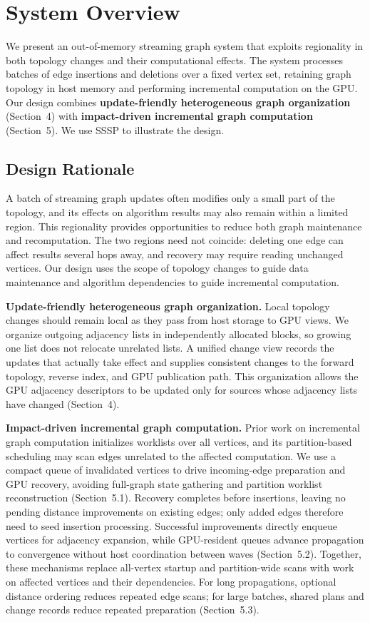 
\section{System Overview}


We present an out-of-memory streaming graph system that exploits regionality in both topology changes and their computational effects. The system processes batches of edge insertions and deletions over a fixed vertex set, retaining graph topology in host memory and performing incremental computation on the GPU. Our design combines \textbf{update-friendly heterogeneous graph organization} (Section~4) with \textbf{impact-driven incremental graph computation} (Section~5). We use SSSP to illustrate the design.

\subsection{Design Rationale}


A batch of streaming graph updates often modifies only a small part of the topology, and its effects on algorithm results may also remain within a limited region. This regionality provides opportunities to reduce both graph maintenance and recomputation. The two regions need not coincide: deleting one edge can affect results several hops away, and recovery may require reading unchanged vertices. Our design uses the scope of topology changes to guide data maintenance and algorithm dependencies to guide incremental computation.

\textbf{Update-friendly heterogeneous graph organization.} Local topology changes should remain local as they pass from host storage to GPU views. We organize outgoing adjacency lists in independently allocated blocks, so growing one list does not relocate unrelated lists. A unified change view records the updates that actually take effect and supplies consistent changes to the forward topology, reverse index, and GPU publication path. This organization allows the GPU adjacency descriptors to be updated only for sources whose adjacency lists have changed (Section~4).

\textbf{Impact-driven incremental graph computation.} Prior work on incremental graph computation initializes worklists over all vertices, and its partition-based scheduling may scan edges unrelated to the affected computation. We use a compact queue of invalidated vertices to drive incoming-edge preparation and GPU recovery, avoiding full-graph state gathering and partition worklist reconstruction (Section~5.1). Recovery completes before insertions, leaving no pending distance improvements on existing edges; only added edges therefore need to seed insertion processing. Successful improvements directly enqueue vertices for adjacency expansion, while GPU-resident queues advance propagation to convergence without host coordination between waves (Section~5.2). Together, these mechanisms replace all-vertex startup and partition-wide scans with work on affected vertices and their dependencies. For long propagations, optional distance ordering reduces repeated edge scans; for large batches, shared plans and change records reduce repeated preparation (Section~5.3).

